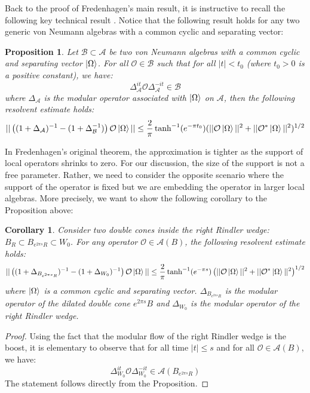 \documentclass[a4paper,11pt]{article}
\newtheorem{corollary}[theorem]{Corollary}
\newtheorem{proposition}[theorem]{Proposition}
\theoremstyle{definition}
\newcommand{\lb}{\left(}
\newcommand{\rb}{\right)}
\begin{document}
Back to the proof of Fredenhagen's main result, it is instructive to recall the following key technical result \cite{fredenhagen}. Notice that the following result holds for any two generic von Neumann algebras with a common cyclic and separating vector:
\begin{proposition}
    Let $\mathcal{B}\subset \mathcal{A}$ be two von Neumann algebras with a common cyclic and separating vector $\ket{\Omega}$. For all $\mathcal{O}\in\mathcal{B}$ such that for all $|t| < t_0$ (where $t_0 > 0$ is a positive constant), we have:
    \begin{equation}
        \Delta_\mathcal{A}^{it}\mathcal{O}\Delta_\mathcal{A}^{-it}\in\mathcal{B}
    \end{equation}
    where $\Delta_\mathcal{A}$ is the modular operator associated with $\ket{\Omega}$ on $\mathcal{A}$, then the following resolvent estimate holds:
    \begin{equation}
        ||\lb(1 + \Delta_\mathcal{A})^{-1} - (1 + \Delta_\mathcal{B}^{-1})\rb\mathcal{O}\ket{\Omega}|| \leq \frac{2}{\pi}\tanh^{-1}(e^{-\pi t_0})(||\mathcal{O}\ket{\Omega}||^2 + ||\mathcal{O}^*\ket{\Omega}||^2)^{1/2}
    \end{equation}
\end{proposition}
In Fredenhagen's original theorem, the approximation is tighter as the support of local operators shrinks to zero. For our discussion, the size of the support is not a free parameter. Rather, we need to consider the opposite scenario where the support of the operator is fixed but we are embedding the operator in larger local algebras. More precisely, we want to show the following corollary to the Proposition above:
\begin{corollary}
    Consider two double cones inside the right Rindler wedge: $B_R\subset B_{e^{2\pi s}R}\subset W_0$. For any operator $\mathcal{O}\in\mathcal{A}(B)$, the following resolvent estimate holds:
    \begin{equation}
        ||\lb(1 + \Delta_{B_{e^{2\pi s}R}})^{-1} - (1 + \Delta_{W_0})^{-1}\rb\mathcal{O}\ket{\Omega}||\leq \frac{2}{\pi}\tanh^{-1}(e^{-\pi s})\lb||\mathcal{O}\ket{\Omega}||^2 + ||\mathcal{O}^*\ket{\Omega}||^2\rb^{1/2}
    \end{equation}
    where $\ket{\Omega}$ is a common cyclic and separating vector. $\Delta_{B_{e^{2\pi s}R}}$ is the modular operator of the dilated double cone $e^{2\pi s}B$ and $\Delta_{W_0}$ is the modular operator of the right Rindler wedge.
\end{corollary}
\begin{proof}
    Using the fact that the modular flow of the right Rindler wedge is the boost, it is elementary to observe that for all time $|t|\leq s$ and for all $\mathcal{O}\in\mathcal{A}(B)$, we have:
    \begin{equation}
        \Delta_{W_0}^{it}\mathcal{O}\Delta^{-it}_{W_0} \in \mathcal{A}(B_{e^{2\pi s}R})
    \end{equation}
    The statement follows directly from the Proposition.
\end{proof}
\end{document}
